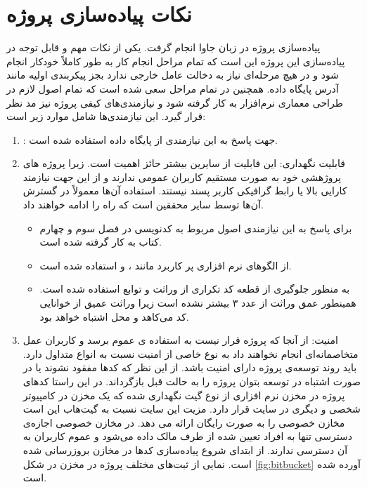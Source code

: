 \section{نکات پیاده‌سازی پروژه}

پیاده‌سازی پروژه در زبان جاوا انجام گرفت. یکی از نکات مهم و قابل توجه در پیاده‌سازی این پروژه این است که تمام مراحل انجام کار  به طور کاملاً خودکار انجام شود و در هیچ مرحله‌ای نیاز به دخالت عامل خارجی  ندارد بجز پیکربندی اولیه مانند آدرس پایگاه داده. همچنین در تمام مراحل سعی شده است که تمام اصول لازم در طراحی معماری نرم‌افزار به کار گرفته شود و نیازمندی‌های کیفی پروژه نیز مد نظر قرار گیرد. این نیازمندی‌ها شامل موارد زیر است:
\begin{enumerate}
\item 
{} : جهت پاسخ به این نیازمندی از پایگاه داده استفاده شده است.
\item
قابلیت نگهداری: این قابلیت از سایرین بیشتر حائز اهمیت است. زیرا پروژه های پروژهشی خود به صورت مستقیم کاربران عمومی ندارند و از این جهت نیازمند کارایی بالا یا رابط گرافیکی کاربر پسند نیستند. استفاده آن‌ها معمولاً در گسترش آن‌ها توسط سایر محققین است که راه را ادامه خواهند داد. 
\begin{itemize}
\item

 برای پاسخ به این نیازمندی اصول مربوط به کدنویسی  در فصل سوم و چهارم کتاب  \cite{martin2009clean} به کار گرفته شده است.
 \item
 از الگوهای نرم افزاری پر کاربرد مانند ،   و  استفاده شده است.
 \item
 به منظور جلوگیری از قطعه کد تکراری از وراثت و توابع  استفاده شده است. همینطور عمق وراثت از عدد ۳ بیشتر نشده است زیرا وراثت عمیق از خوانایی کد می‌کاهد و محل اشتباه خواهد بود. 
\end{itemize}
\item
امنیت: از آنجا که پروژه قرار نیست به استفاده ی عموم برسد و کاربران عمل متخاصمانه‌ای انجام نخواهند داد   به نوع خاصی از امنیت  نسبت به انواع متداول دارد.  باید روند توسعه‌ی پروژه دارای امنیت باشد. از این نظر که کدها مفقود نشوند یا در صورت اشتباه در توسعه بتوان پروژه را به حالت قبل بازگرداند. در این راستا کدهای پروژه در مخزن نرم افزاری از نوع گیت نگهداری شده که یک مخزن در کامپیوتر شخصی و دیگری در سایت  
قرار دارد. مزیت این سایت نسبت به گیت‌هاب این است مخازن خصوصی  را به صورت رایگان ارائه می دهد. در مخازن خصوصی  اجازه‌ی دسترسی تنها به  افراد تعیین شده از طرف مالک  داده می‌شود و عموم کاربران به آن دسترسی ندارند. از ابتدای شروع پیاده‌سازی کدها در مخازن بروزرسانی شده است. نمایی از ثبت‌های مختلف پروژه در مخزن در شکل \ref{fig:bitbucket}
آورده شده است. 
\end{enumerate}

